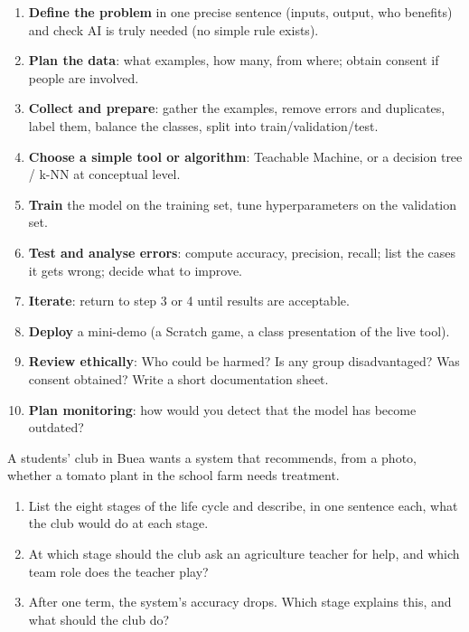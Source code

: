 \documentclass[11pt]{article}
\begin{document}
\begin{methode}
\begin{enumerate}
\item \textbf{Define the problem} in one precise sentence (inputs, output, who benefits) and check AI is truly needed (no simple rule exists).
\item \textbf{Plan the data}: what examples, how many, from where; obtain consent if people are involved.
\item \textbf{Collect and prepare}: gather the examples, remove errors and duplicates, label them, balance the classes, split into train/validation/test.
\item \textbf{Choose a simple tool or algorithm}: Teachable Machine, or a decision tree / k-NN at conceptual level.
\item \textbf{Train} the model on the training set, tune hyperparameters on the validation set.
\item \textbf{Test and analyse errors}: compute accuracy, precision, recall; list the cases it gets wrong; decide what to improve.
\item \textbf{Iterate}: return to step 3 or 4 until results are acceptable.
\item \textbf{Deploy} a mini-demo (a Scratch game, a class presentation of the live tool).
\item \textbf{Review ethically}: Who could be harmed? Is any group disadvantaged? Was consent obtained? Write a short documentation sheet.
\item \textbf{Plan monitoring}: how would you detect that the model has become outdated?
\end{enumerate}
\end{methode}

\begin{exercice}
A students' club in Buea wants a system that recommends, from a photo, whether a tomato plant in the school farm needs treatment.
\begin{enumerate}
\item List the eight stages of the life cycle and describe, in one sentence each, what the club would do at each stage.
\item At which stage should the club ask an agriculture teacher for help, and which team role does the teacher play?
\item After one term, the system's accuracy drops. Which stage explains this, and what should the club do?
\end{enumerate}
\end{exercice}
\end{document}
